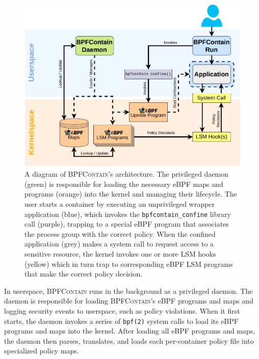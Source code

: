 \documentclass[dvipsnames, 12pt]{article}
\def\bpfcontain{\textsc{BPFContain}}
\begin{document}
\begin{figure}[htpb]
  \centering
  \includegraphics[width=0.8\linewidth]{figs/architecture.pdf}
  \caption{
    A diagram of \bpfcontain{}'s architecture. The privileged daemon (green) is
    responsible for loading the necessary eBPF maps and programs (orange) into
    the kernel and managing their lifecycle. The user starts a container by
    executing an unprivileged wrapper application (blue), which invokes the
    \texttt{bpfcontain\_confine} library call (purple), trapping to a special
    eBPF program that associates the process group with the correct policy.
    When the confined application (grey) makes a system call to request access
    to a sensitive resource, the kernel invokes one or more LSM hooks (yellow)
    which in turn trap to corresponding eBPF LSM programs that make the correct
    policy decision.
  }%
  \label{fig:architecture}
\end{figure}


In userspace, \bpfcontain{} runs in the background as a privileged daemon.  The
daemon is responsible for loading \bpfcontain{}'s eBPF programs and maps and
logging security events to userspace, such as policy violations.  When it first
starts, the daemon invokes a series of \texttt{bpf(2)} system calls to load its
eBPF programs and maps into the kernel. After loading all eBPF programs and
maps, the daemon then parses, translates, and loads each per-container policy
file into specialized policy maps.
\end{document}
